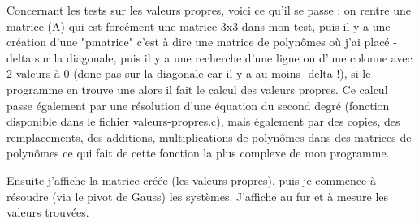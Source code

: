 Concernant les tests sur les valeurs propres, voici ce qu'il se passe : 
on rentre une matrice (A) qui est forcément une matrice 3x3 dans mon test, 
puis il y a une création d'une "pmatrice" c'est à dire une matrice de polynômes où j'ai placé -delta sur la diagonale,
puis il y a une recherche d'une ligne ou d'une colonne avec 2 valeurs à 0 (donc pas sur la diagonale car il y a au moins -delta !),
si le programme en trouve une alors il fait le calcul des valeurs propres. 
Ce calcul passe également par une résolution d'une équation du second degré (fonction disponible dans le fichier valeurs-propres.c), 
mais également par des copies, des remplacements, des additions, multiplications de polynômes dans des matrices de polynômes ce qui fait 
de cette fonction la plus complexe de mon programme.

Ensuite j'affiche la matrice créée (les valeurs propres), puis je commence à résoudre (via le pivot de Gauss) les systèmes.
J'affiche au fur et à mesure les valeurs trouvées.

\clearpage
